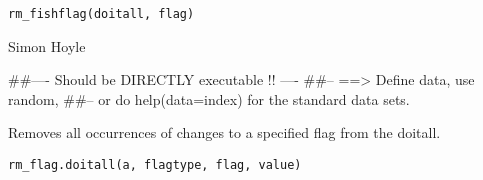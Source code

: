 \documentclass[a4paper]{book}
\begin{document}
%
\begin{Usage}
\begin{verbatim}
rm_fishflag(doitall, flag)
\end{verbatim}
\end{Usage}
%
\begin{Arguments}
\begin{ldescription}
\item[\code{doitall}] 


\item[\code{flag}] 


\end{ldescription}
\end{Arguments}
%
\begin{Author}\relax

Simon Hoyle
\end{Author}
%
\begin{Examples}
\begin{ExampleCode}
##---- Should be DIRECTLY executable !! ----
##-- ==>  Define data, use random,
##--	or do  help(data=index)  for the standard data sets.

\end{ExampleCode}
\end{Examples}
%
\begin{Description}\relax

Removes all occurrences of changes to a specified flag from the doitall.
\end{Description}
%
\begin{Usage}
\begin{verbatim}
rm_flag.doitall(a, flagtype, flag, value)
\end{verbatim}
\end{Usage}
%
\begin{Arguments}
\begin{ldescription}
\item[\code{a}] 


\item[\code{flagtype}] 


\item[\code{flag}] 


\item[\code{value}] 


\end{ldescription}
\end{Arguments}
\end{document}
